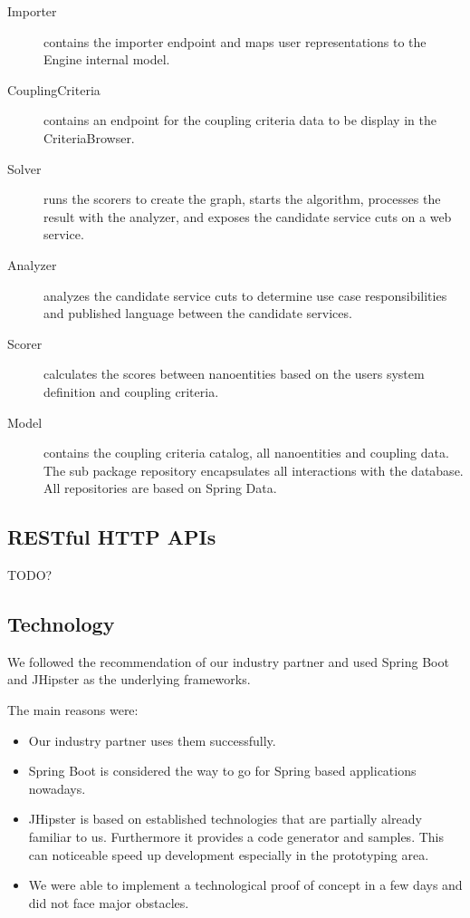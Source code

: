 \begin{description}
	\item[Importer] contains the importer endpoint and maps user representations to the Engine internal model. 
	\item[CouplingCriteria] contains an endpoint for the coupling criteria data to be display in the CriteriaBrowser.
	\item[Solver] runs the scorers to create the graph, starts the algorithm, processes the result with the analyzer, and exposes the candidate service cuts on a web service.
	\item[Analyzer] analyzes the candidate service cuts to determine use case responsibilities and published language between the candidate services.
	\item[Scorer] calculates the scores between nanoentities based on the users system definition and coupling criteria.
	\item[Model] contains the coupling criteria catalog, all nanoentities and coupling data. The sub package repository encapsulates all interactions with the database. All repositories are based on Spring Data\cite{springdata}. %
\end{description}


\subsection{RESTful HTTP APIs}

TODO?

\subsection{Technology}
\label{subsec:technology}

We followed the recommendation of our industry partner and used Spring Boot\cite{springboot} and JHipster\cite{jhipster} as the underlying frameworks.

The main reasons were:

\begin{itemize}
	\item Our industry partner uses them successfully.
	\item Spring Boot is considered the way to go for Spring based applications nowadays.
	\item JHipster is based on established technologies that are partially already familiar to us. Furthermore it provides a code generator and samples. This can noticeable speed up development especially in the prototyping area.
	\item We were able to implement a technological proof of concept in a few days and did not face major obstacles.
\end{itemize}


